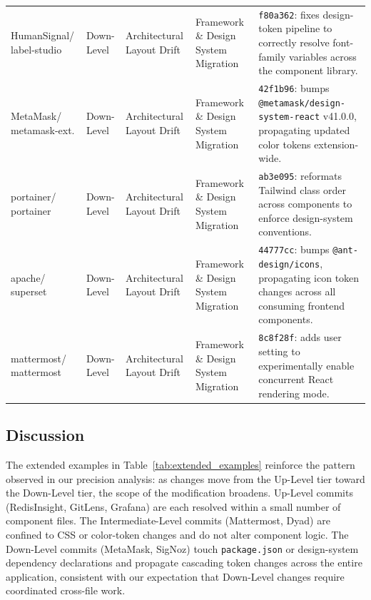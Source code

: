 \documentclass{article}
\begin{document}
\begin{table}[H]
{\begin{tabularx}{\textwidth}{p{1.8cm} p{1.5cm} p{2.3cm} p{2.3cm} X}
HumanSignal/ label-studio & Down-Level & Architectural Layout Drift & Framework \& Design System Migration & \texttt{f80a362}: fixes design-token pipeline to correctly resolve font-family variables across the component library. \cite{commit:labelstudio:tokens} \\
\addlinespace

MetaMask/ metamask-ext. & Down-Level & Architectural Layout Drift & Framework \& Design System Migration & \texttt{42f1b96}: bumps \texttt{@metamask/design-system-react} v41.0.0, propagating updated color tokens extension-wide. \cite{commit:metamask:designsystem} \\
\addlinespace

portainer/ portainer & Down-Level & Architectural Layout Drift & Framework \& Design System Migration & \texttt{ab3e095}: reformats Tailwind class order across components to enforce design-system conventions. \cite{commit:portainer:tailwind} \\
\addlinespace

apache/ superset & Down-Level & Architectural Layout Drift & Framework \& Design System Migration & \texttt{44777cc}: bumps \texttt{@ant-design/icons}, propagating icon token changes across all consuming frontend components. \cite{commit:superset:antdesign} \\
\addlinespace

mattermost/ mattermost & Down-Level & Architectural Layout Drift & Framework \& Design System Migration & \texttt{8c8f28f}: adds user setting to experimentally enable concurrent React rendering mode. \cite{commit:mattermost:react} \\

\bottomrule
\end{tabularx}
}
\end{table}

\newpage
\subsection{Discussion}

The extended examples in Table~\ref{tab:extended_examples} reinforce the
pattern observed in our precision analysis: as changes move from the
Up-Level tier toward the Down-Level tier, the scope of the modification
broadens. Up-Level commits (RedisInsight, GitLens, Grafana) are each
resolved within a small number of component files. The Intermediate-Level
commits (Mattermost, Dyad) are confined to CSS or color-token changes and
do not alter component logic. The Down-Level commits (MetaMask, SigNoz)
touch \texttt{package.json} or design-system dependency declarations and
propagate cascading token changes across the entire application,
consistent with our expectation that Down-Level changes require
coordinated cross-file work.
\end{document}
